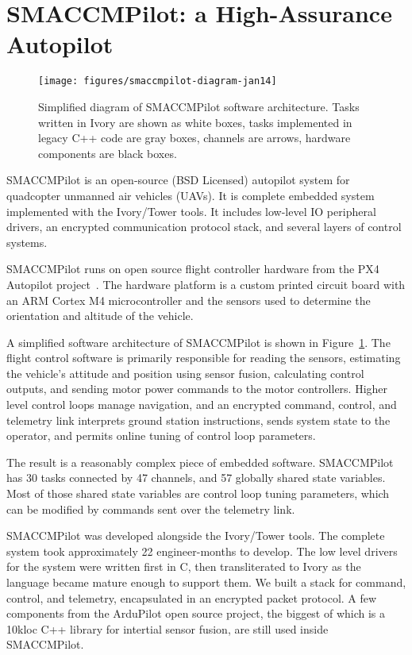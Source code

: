 \section{SMACCMPilot: a High-Assurance Autopilot}
\label{sec:smaccmpilot}

\begin{figure}[ht!]
  \begin{center}
\texttt{[image: figures/smaccmpilot-diagram-jan14]}
  \end{center}
\caption[SMACCMPilot software architecture]{
Simplified diagram of SMACCMPilot
software architecture. Tasks written in Ivory are shown as white boxes,
tasks implemented in legacy C++ code are gray boxes,
channels are arrows,
hardware components are black boxes.}
\label{fig:smaccmpilotSwArch}
\end{figure}

SMACCMPilot is an open-source (BSD Licensed) autopilot system for quadcopter
unmanned air vehicles (UAVs).
It is complete embedded system implemented with
the Ivory/Tower tools.
It includes low-level IO peripheral drivers, an encrypted
communication protocol stack, and several layers of control systems.

SMACCMPilot runs on open source flight controller hardware from the PX4
Autopilot project~\cite{px4-proj}. The hardware platform is
a custom printed circuit board with an ARM Cortex M4 microcontroller and the
sensors used to determine the orientation and altitude of the vehicle.


A simplified software architecture of SMACCMPilot is shown in
Figure~\ref{fig:smaccmpilotSwArch}.
The flight control software is primarily responsible for reading the sensors,
estimating the vehicle's attitude and position using sensor fusion, calculating
control outputs, and sending motor power commands to the motor controllers.
Higher level control loops manage navigation, and an encrypted command, control,
and telemetry link interprets ground station instructions, sends system state to
the operator, and permits online tuning of control loop parameters.

The result is a reasonably complex piece of embedded software. SMACCMPilot has
30 tasks connected by 47 channels, and 57 globally shared state variables. Most
of those shared state variables are control loop tuning parameters, which can be
modified by commands sent over the telemetry link.

SMACCMPilot was developed alongside the Ivory/Tower tools.  The complete system
took approximately 22 engineer-months to develop.  The low level drivers for the
system were written first in C, then transliterated to Ivory as the language
became mature enough to support them. We built a stack for command, control, and
telemetry, encapsulated in an encrypted packet protocol. A few components from
the ArduPilot open source project, the biggest of which is a 10kloc C++ library
for intertial sensor fusion, are still used inside SMACCMPilot.


